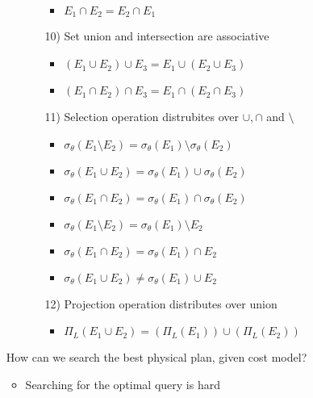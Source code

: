 \begin{itemize}
\begin{itemize}
\begin{itemize}
\begin{itemize}
                            \item $E_1 \cap E_2 = E_2 \cap E_1$
                        \end{itemize}
                    \item[10)] Set union and intersection are associative
                        \begin{itemize}
                            \item $(E_1 \cup E_2) \cup E_3 = E_1 \cup (E_2 \cup E_3)$
                            \item $(E_1 \cap E_2) \cap E_3 = E_1 \cap (E_2 \cap E_3)$
                        \end{itemize}
                    \item[11)] Selection operation distrubites over $\cup, \cap$ and $\setminus$
                        \begin{itemize}
                            \item $\sigma_\theta(E_1 \setminus E_2) = \sigma_\theta(E_1) \setminus \sigma_\theta(E_2)$
                            \item $\sigma_\theta(E_1 \cup E_2) = \sigma_\theta(E_1) \cup \sigma_\theta(E_2)$
                            \item $\sigma_\theta(E_1 \cap E_2) = \sigma_\theta(E_1) \cap \sigma_\theta(E_2)$
                            \item $\sigma_\theta(E_1 \setminus E_2) = \sigma_\theta(E_1) \setminus E_2$
                            \item $\sigma_\theta(E_1 \cap E_2) = \sigma_\theta(E_1) \cap E_2$
                            \item $\sigma_\theta(E_1 \cup E_2) \neq \sigma_\theta(E_1) \cup E_2$
                        \end{itemize}
                    \item[12)] Projection operation distributes over union
                        \begin{itemize}
                            \item $\Pi_L(E_1 \cup E_2) = (\Pi_L(E_1)) \cup (\Pi_L(E_2))$
                        \end{itemize}
                \end{itemize}
        \end{itemize}
     How can we search the best physical plan, given cost model?
        \begin{itemize}
            \item Searching for the optimal query is hard

\end{itemize}
\end{itemize}

